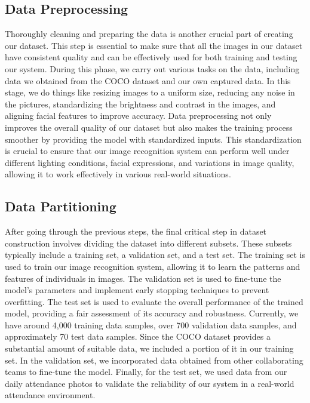 \subsection{Data Preprocessing}
\label{subsec:method}
Thoroughly cleaning and preparing the data is another crucial part of creating our dataset. This step is essential to make sure that all the images in our dataset have consistent quality and can be effectively used for both training and testing our system. During this phase, we carry out various tasks on the data, including data we obtained from the COCO dataset and our own captured data. In this stage, we do things like resizing images to a uniform size, reducing any noise in the pictures, standardizing the brightness and contrast in the images, and aligning facial features to improve accuracy. Data preprocessing not only improves the overall quality of our dataset but also makes the training process smoother by providing the model with standardized inputs. This standardization is crucial to ensure that our image recognition system can perform well under different lighting conditions, facial expressions, and variations in image quality, allowing it to work effectively in various real-world situations.\\
\label{sec:method}
\subsection{Data Partitioning}
\label{subsec:method}
After going through the previous steps, the final critical step in dataset construction involves dividing the dataset into different subsets. These subsets typically include a training set, a validation set, and a test set. The training set is used to train our image recognition system, allowing it to learn the patterns and features of individuals in images. The validation set is used to fine-tune the model's parameters and implement early stopping techniques to prevent overfitting. The test set is used to evaluate the overall performance of the trained model, providing a fair assessment of its accuracy and robustness. Currently, we have around 4,000 training data samples, over 700 validation data samples, and approximately 70 test data samples. Since the COCO dataset provides a substantial amount of suitable data, we included a portion of it in our training set. In the validation set, we incorporated data obtained from other collaborating teams to fine-tune the model. Finally, for the test set, we used data from our daily attendance photos to validate the reliability of our system in a real-world attendance environment.\\
